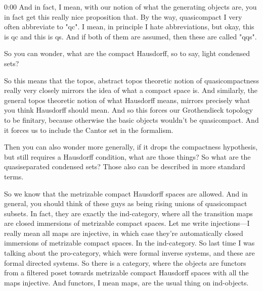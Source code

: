 \begin{unfinished}{0:00}
And in fact, I mean, with our notion of what the generating objects are, you in fact get this really nice proposition that. By the way, quasicompact I very often abbreviate to "qc". I mean, in principle I hate abbreviations, but okay, this is qc and this is qs. And if both of them are assumed, then these are called "qqs".

\begin{proposition}
\end{proposition}

So you can wonder, what are the compact Hausdorff, so to say, light condensed sets?

So this means that the topos, abstract topos theoretic notion of quasicompactness really very closely mirrors the idea of what a compact space is. 
And similarly, the general topos theoretic notion of what Hausdorff means, mirrors precisely what you think Hausdorff should mean. And so this forces our Grothendieck topology to be finitary, because otherwise the basic objects wouldn't be quasicompact. And it forces us to include the Cantor set in the formalism.

Then you can also wonder more generally, if it drops the compactness hypothesis, but still requires a Hausdorff condition, what are those things? So what are the quasiseparated condensed sets? Those also can be described in more standard terms.

So we know that the metrizable compact Hausdorff spaces are allowed. And in general, you should think of these guys as being rising unions of quasicompact subsets. In fact, they are exactly the ind-category, where all the transition maps are closed immersions of metrizable compact spaces. Let me write injections---I really mean all maps are injective, in which case they're automatically closed immersions of metrizable compact spaces. In the ind-category. So last time I was talking about the pro-category, which were formal inverse systems, and these are formal directed systems. So there is a category, where the objects are functors from a filtered poset towards metrizable compact Hausdorff spaces with all the maps injective. And functors, I mean maps, are the usual thing on ind-objects.


\end{unfinished}
